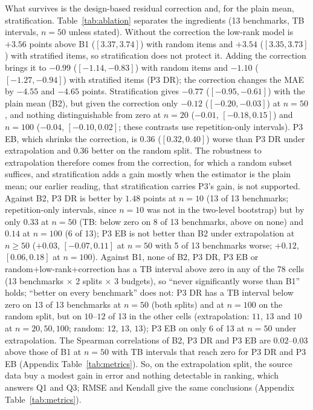What survives is the design-based residual correction and, for the plain mean, stratification. Table~\ref{tab:ablation} separates the ingredients (13 benchmarks, TB intervals, $n{=}50$ unless stated). Without the correction the low-rank model is $+3.56$ points above B1 ($[3.37,3.74]$) with random items and $+3.54$ ($[3.35,3.73]$) with stratified items, so stratification does not protect it. Adding the correction brings it to $-0.99$ ($[-1.14,-0.83]$) with random items and $-1.10$ ($[-1.27,-0.94]$) with stratified items (P3 DR); the correction changes the MAE by $-4.55$ and $-4.65$ points. Stratification gives $-0.77$ ($[-0.95,-0.61]$) with the plain mean (B2), but given the correction only $-0.12$ ($[-0.20,-0.03]$) at $n{=}50$, and nothing distinguishable from zero at $n{=}20$ ($-0.01$, $[-0.18,0.15]$) and $n{=}100$ ($-0.04$, $[-0.10,0.02]$; these contrasts use repetition-only intervals). P3 EB, which shrinks the correction, is $0.36$ ($[0.32,0.40]$) worse than P3 DR under extrapolation and $0.36$ better on the random split. The robustness to extrapolation therefore comes from the correction, for which a random subset suffices, and stratification adds a gain mostly when the estimator is the plain mean; our earlier reading, that stratification carries P3's gain, is not supported. Against B2, P3 DR is better by $1.48$ points at $n{=}10$ (13 of 13 benchmarks; repetition-only intervals, since $n{=}10$ was not in the two-level bootstrap) but by only $0.33$ at $n{=}50$ (TB: below zero on 8 of 13 benchmarks, above on none) and $0.14$ at $n{=}100$ (6 of 13); P3 EB is not better than B2 under extrapolation at $n\ge50$ ($+0.03$, $[-0.07,0.11]$ at $n{=}50$ with 5 of 13 benchmarks worse; $+0.12$, $[0.06,0.18]$ at $n{=}100$). Against B1, none of B2, P3 DR, P3 EB or random+low-rank+correction has a TB interval above zero in any of the 78 cells (13 benchmarks $\times$ 2 splits $\times$ 3 budgets), so ``never significantly worse than B1'' holds; ``better on every benchmark'' does not: P3 DR has a TB interval below zero on 13 of 13 benchmarks at $n{=}50$ (both splits) and at $n{=}100$ on the random split, but on $10$--$12$ of 13 in the other cells (extrapolation: $11$, $13$ and $10$ at $n{=}20,50,100$; random: $12$, $13$, $13$); P3 EB on only $6$ of 13 at $n{=}50$ under extrapolation. The Spearman correlations of B2, P3 DR and P3 EB are $0.02$--$0.03$ above those of B1 at $n{=}50$ with TB intervals that reach zero for P3 DR and P3 EB (Appendix Table~\ref{tab:metrics}). So, on the extrapolation split, the source data buy a modest gain in error and nothing detectable in ranking, which answers Q1 and Q3; RMSE and Kendall give the same conclusions (Appendix Table~\ref{tab:metrics}).

